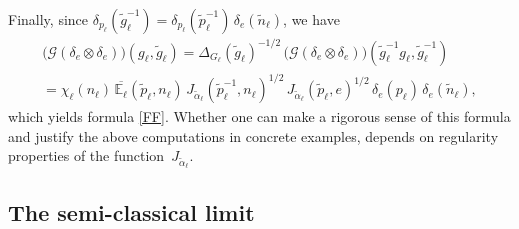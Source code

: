 \documentclass[a4paper,11pt,reqno]{amsart}
\numberwithin{equation}{section}
\theoremstyle{remark}
\theoremstyle{definition}
\newcommand{\G}{{\mathcal G}}
\newcommand{\E}{\mathbb E}
\begin{document}
Finally, since $\delta_{p_\ell}(\tilde g_\ell^{-1})=\delta_{p_\ell}(\tilde p_\ell^{-1})\,\delta_e(\tilde n_\ell)$, we have
\begin{multline*}
\big(\G(\delta_e\otimes \delta_e)\big)(g_\ell,\tilde g_\ell)=\Delta_{G_\ell}(\tilde g_\ell)^{-1/2}\,\big(\G(\delta_e\otimes \delta_e)\big)(\tilde g_\ell^{-1}g_\ell,\tilde g_\ell^{-1})\\
=\chi_\ell(n_\ell)\,\overline{\E_\ell}(\tilde p_\ell,n_\ell)\, J_{\tilde\alpha_\ell}(\tilde p_\ell^{-1},n_\ell)^{1/2}\,J_{\tilde\alpha_\ell}(\tilde p_\ell,e)^{1/2}\,
\delta_e(p_\ell)\,\delta_e(\tilde n_\ell),
\end{multline*}
which yields formula \eqref{FF}. Whether one can make a rigorous sense of this formula and justify the above computations in concrete examples, depends on regularity properties of the function~$J_{\tilde\alpha_\ell}$.

\subsection{The semi-classical limit}
\end{document}

